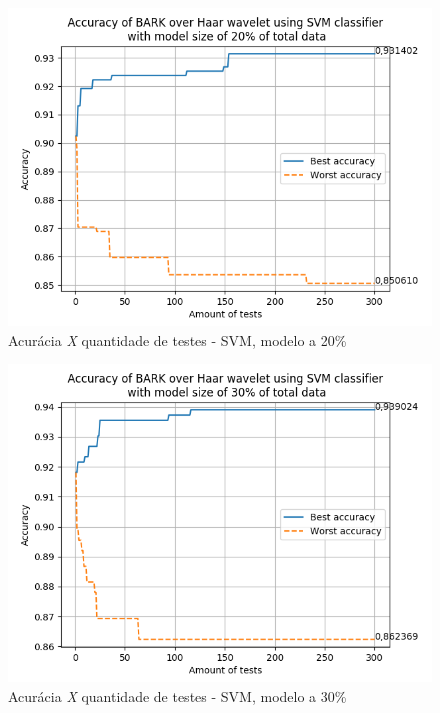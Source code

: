 \begin{myenv}{1.5}
		\newpage
		\begin{figure}[h]
			\centering
			\includegraphics{images/results/confusionMatrices/classifier_SVM_20.png}
			\caption{Acurácia \textit{X} quantidade de testes - SVM, modelo a 20\%}
			\label{fig:classifiersvm20}
		\end{figure}
		
		
		\newpage
		\begin{figure}[h]
			\centering
			\includegraphics{images/results/confusionMatrices/classifier_SVM_30.png}
			\caption{Acurácia \textit{X} quantidade de testes - SVM, modelo a 30\%}
			\label{fig:classifiersvm30}
		\end{figure}
		
	

\end{myenv}
